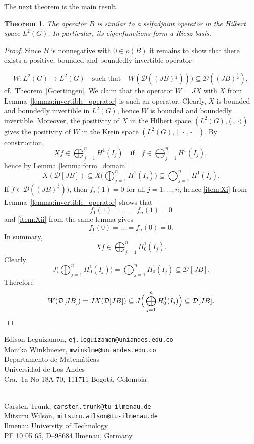 \documentclass{article}
\numberwithin{equation}{section}
\newtheorem{theorem}{Theorem}[section]
\theoremstyle{definition}
\newcommand{\kip}{[\,\cdot\, , \cdot\,]}
\newcommand{\mD}{\mathcal{D}}
\newcommand{\scalar}[2]{\langle#1,\, #2\rangle}
\newcommand{\AKone}{B}
\begin{document}
The next theorem is the main result.
\begin{theorem}
   The operator $\AKone$ is similar to a selfadjoint operator in the Hilbert space $L^2(G)$. In particular, its eigenfunctions form a Riesz basis.
\end{theorem}
\begin{proof}
   Since $\AKone$ is nonnegative with $0\in \rho(\AKone)$ it remains to show that there exists a positive, bounded and boundedly invertible operator 

   $$
   W:L^2(G) \to L^2(G) \quad \mbox{such that} \quad 
   W(\mD(( J\AKone )^{\frac{1}{2}}))) \subseteq 
   \mD(( J\AKone )^{\frac{1}{2}}),
   $$
   cf.\ Theorem~\ref{Goettingen}.
   We claim that the operator $W = JX$ with $X$ from Lemma~\ref{lemma:invertible_operator} is such an operator.
   Clearly, $X$ is bounded and boundedly invertible in $L^2(G)$, hence $W$ is bounded and boundedly invertible.
   Moreover, the positivity of $X$ in the Hilbert space $(L^2(G),\scalar{\cdot}{\cdot})$ gives the positivity of $W$ in the Krein space $(L^2(G),\kip)$.
   By construction, 
   $$
   Xf\in \bigoplus_{j=1}^n H^1(I_j) \quad 
   \mbox{if} \quad f\in \bigoplus_{j=1}^n H^1(I_j),
   $$
   hence by Lemma \ref{lemma:form_domain}
   $$
   X(\mD[J\AKone])\subseteq X\Big(\bigoplus_{j=1}^n H^1(I_j)\Big)\subseteq \bigoplus_{j=1}^n H^1(I_j).
   $$
   If $f\in \mD( (J\AKone)^{\frac{1}{2}}) )$, then $f_j(1) = 0$ for all $j=1,\dots, n$, 
   hence \ref{item:Xi} from Lemma~\ref{lemma:invertible_operator} shows that 
   $$
   f_1(1) = \dots = f_n(1) = 0
   $$
   and \ref{item:Xii} from the same lemma gives 
   $$
   f_1(0) = \dots = f_n(0) = 0.
   $$
   In summary, 
   $$
   Xf\in \bigoplus_{j=1}^n H_0^1(I_j).
   $$
   Clearly 
   $$
   J \Big( \bigoplus_{j=1}^n H_0^1(I_j) \Big) = \bigoplus_{j=1}^n H_0^1(I_j) \subseteq \mD[J\AKone].
   $$
   Therefore
   \begin{equation*}
      W(\mD[J\AKone]) = JX(\mD[J\AKone])
      \subseteq J \Big( \bigoplus_{j=1}^n H_0^1(I_j) \Big)
      \subseteq \mD[J\AKone].
      \qedhere
   \end{equation*}
\end{proof}



\noindent
Edison Leguizamon, {\tt ej.leguizamon@uniandes.edu.co}\\
Monika Winklmeier, {\tt mwinklme@uniandes.edu.co}\\
Departamento de Matem\'aticas\\
Universidad de Los Andes\\
Cra.\ 1a No 18A-70, 111711 Bogotá,
Colombia

\ \\
Carsten Trunk, {\tt carsten.trunk@tu-ilmenau.de}\\
Mitsuru Wilson, {\tt mitsuru.wilson@tu-ilmenau.de}\\
Ilmenau University of Technology\\
	PF 10 05 65, D--98684 Ilmenau, Germany
\end{document}

